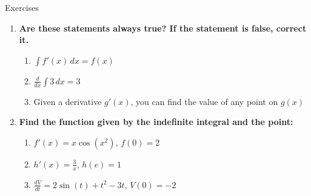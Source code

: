 \documentclass[../revisedmain.tex]{subfiles}
\begin{document}
	\begin{center}
		\LARGE Exercises
	\end{center}
	\begin{enumerate}
		\item \textbf{Are these statements always true? If the statement is false, correct it.}
		\begin{enumerate}
			\item $\int f'(x)\, dx = f(x)$
			\item $\frac{d}{dx}\int 3\,dx = 3$
			\item Given a derivative $g'(x)$, you can find the value of any point on $g(x)$
		\end{enumerate}
		\item \textbf{Find the function given by the indefinite integral and the point:}
		\begin{enumerate}
			\item $f'(x)=x\cos(x^2)$, $f(0)=2$
			\item $h'(x)=\frac{3}{x}$, $h(e)=1$
			\item $\frac{dV}{dt}=2\sin(t)+t^2-3t$, $V(0)=-2$
		\end{enumerate}
	\end{enumerate}
\end{document}
